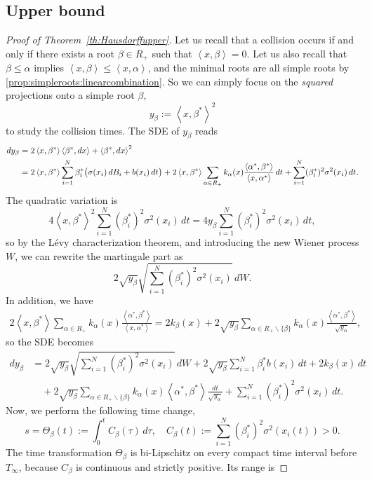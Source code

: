 \documentclass{article}
\numberwithin{equation}{section}
\newcommand{\inner}[2]{\left<#1,#2\right>}
\newcommand{\xa}{\left<x,\alpha\right>}
\newcommand{\xb}{\left<x,\beta\right>}
\newcommand{\xas}{\left<x,\alpha^*\right>}
\newcommand{\xbs}{\left<x,\beta^*\right>}
\newcommand{\aR}{\alpha\in R_+}
\newcommand{\SaR}{\sum_{\alpha\in R_+}}
\newcommand{\SaRnb}{\sum_{\aR\backslash\{\beta\}}}
\newcommand{\Sni}{\sum_{i=1}^N}
\theoremstyle{plain}
\begin{document}
\subsection{Upper bound}\label{sec:upperbound}

    \begin{proof}[Proof of Theorem~\ref{th:Hausdorffupper}]
        Let us recall that a collision occurs if and only if there exists a root $\beta\in R_+$ such that $\xb=0$. Let us also recall that $\beta\leq\alpha$  implies $\xb\leq\xa$, and the minimal roots are all simple roots by \ref{prop:simpleroots:linearcombination}. So we can simply focus on the \emph{squared} projections onto a simple root $\beta$,
        \[y_\beta:=\xbs^2\]
        to study the collision times.
        The SDE of $y_\beta$ reads
        \begin{align}
            d y_\beta &= 2\xbs\inner{\beta^*}{dx}+\inner{\beta^*}{dx}^2\notag\\
            &= 2\xbs\Sni\beta_i^*\big(\sigma(x_i)\, dB_i+b(x_i)\, dt\big)+2\xbs\SaR k_\alpha(x)\frac{\inner{\alpha^*}{\beta^*}}{\xas}\, dt+\Sni(\beta_i^*)^2 \sigma^2(x_i)\, dt.\notag
        \end{align}
        The quadratic variation is
        \[4\xbs^2\Sni(\beta_i^*)^2\sigma^2(x_i)\, dt=4y_\beta\Sni(\beta_i^*)^2\sigma^2(x_i)\, dt,\]
        so by the Lévy characterization theorem, and introducing the new Wiener process $W$, we can rewrite the martingale part as
        \[2\sqrt{y_\beta}\sqrt{\Sni(\beta_i^*)^2\sigma^2(x_i)}\, dW.\]
        In addition, we have
        \begin{align*}
            2\xbs\SaR k_\alpha(x)\frac{\inner{\alpha^*}{\beta^*}}{\xas}=2k_\beta(x)+2\sqrt{y_\beta}\SaRnb k_\alpha(x)\frac{\inner{\alpha^*}{\beta^*}}{\sqrt{y_\alpha}},
        \end{align*}
        so the SDE becomes
        \begin{align*}
            dy_\beta &= 2\sqrt{y_\beta}\sqrt{\Sni (\beta_i^*)^2\sigma^2(x_i)}\, dW+2\sqrt{y_\beta}\Sni\beta_i^*b(x_i)\, dt+2k_\beta(x)\, dt\\
            &\quad+2\sqrt{y_\beta}\SaRnb k_\alpha(x)\inner{\alpha^*}{\beta^*}\frac{dt}{\sqrt{y_\alpha}}+\Sni(\beta_i^*)^2\sigma^2(x_i)\, dt.
        \end{align*}
        Now, we perform the following time change,
        \[s=\Theta_\beta(t):=\int_0^tC_\beta(\tau)\, d\tau,\quad C_\beta(t):= \Sni(\beta_i^*)^2\sigma^2(x_i(t))>0.\]
        The time transformation $\Theta_\beta$ is bi-Lipschitz on every compact time interval before $T_\infty$, because $C_\beta$ is continuous and strictly positive. Its range is

\end{proof}
\end{document}
